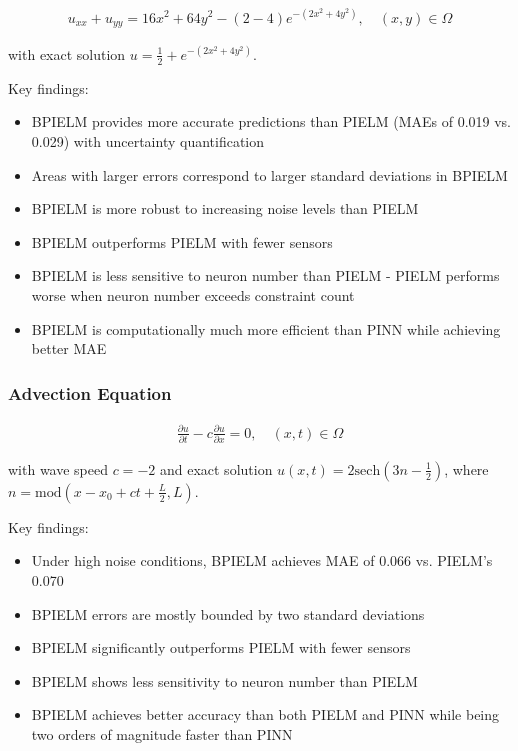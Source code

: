 \documentclass[11pt]{article}
\begin{document}
\begin{align}
    u_{xx} + u_{yy} = 16x^2 + 64y^2 - (2-4) e^{-(2x^2+4y^2)}, \quad (x,y) \in \Omega
\end{align}

with exact solution $u = \frac{1}{2} + e^{-(2x^2+4y^2)}$.

Key findings:
\begin{itemize}
    \item BPIELM provides more accurate predictions than PIELM (MAEs of 0.019 vs. 0.029) with uncertainty quantification
    \item Areas with larger errors correspond to larger standard deviations in BPIELM
    \item BPIELM is more robust to increasing noise levels than PIELM
    \item BPIELM outperforms PIELM with fewer sensors
    \item BPIELM is less sensitive to neuron number than PIELM - PIELM performs worse when neuron number exceeds constraint count
    \item BPIELM is computationally much more efficient than PINN while achieving better MAE
\end{itemize}

\subsubsection{Advection Equation}

\begin{align}
    \frac{\partial u}{\partial t} - c\frac{\partial u}{\partial x} = 0, \quad (x,t) \in \Omega
\end{align}

with wave speed $c = -2$ and exact solution $u(x,t) = 2\text{sech}(3n-\frac{1}{2})$, where $n = \text{mod}(x-x_0+ct+\frac{L}{2}, L)$.

Key findings:
\begin{itemize}
    \item Under high noise conditions, BPIELM achieves MAE of 0.066 vs. PIELM's 0.070
    \item BPIELM errors are mostly bounded by two standard deviations
    \item BPIELM significantly outperforms PIELM with fewer sensors
    \item BPIELM shows less sensitivity to neuron number than PIELM
    \item BPIELM achieves better accuracy than both PIELM and PINN while being two orders of magnitude faster than PINN
\end{itemize}
\end{document}
